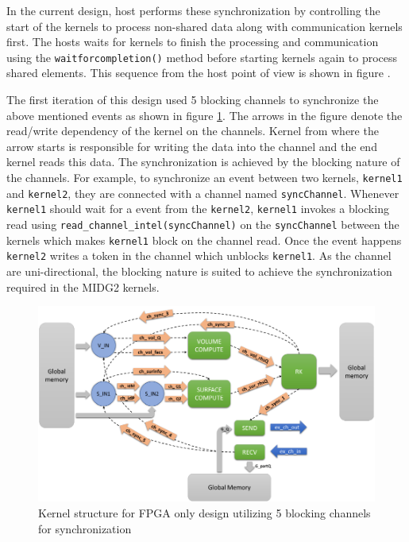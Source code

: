 In the current design, host performs these synchronization by controlling the start of the kernels
to process non-shared data along with communication kernels first. The hosts waits for kernels to
finish the processing and communication using the \texttt{waitforcompletion()} method before starting
kernels again to process shared elements. This sequence from the host point of view is
shown in figure .

The first iteration of this design used 5 blocking channels to synchronize the above mentioned
events as shown in figure \ref{fig:channelsync_kernstruc}.
The arrows in the figure denote the read/write dependency of the kernel on the channels.
Kernel from where the arrow starts is responsible for writing the data into the channel
and the end kernel reads this data. The synchronization is achieved by the blocking
nature of the channels. For example, to synchronize an event between two kernels,
\texttt{kernel1} and \texttt{kernel2}, they are connected with a channel named \texttt{syncChannel}.
Whenever \texttt{kernel1} should wait for a event from the \texttt{kernel2},
\texttt{kernel1} invokes a blocking read using \texttt{read\_channel\_intel(syncChannel)} on the
\texttt{syncChannel} between the kernels which makes
\texttt{kernel1} block on the channel read. Once the event happens \texttt{kernel2} writes a token in the channel
which unblocks \texttt{kernel1}. As the channel are uni-directional, the blocking nature is suited
to achieve the synchronization required in the MIDG2 kernels.

\begin{figure}[ht]%
    \centering
    \includegraphics[width=1.0\textwidth]{images/channelssync_kernstruc}
    \caption{Kernel structure for FPGA only design utilizing 5 blocking channels for synchronization}
    \label{fig:channelsync_kernstruc}
\end{figure}

